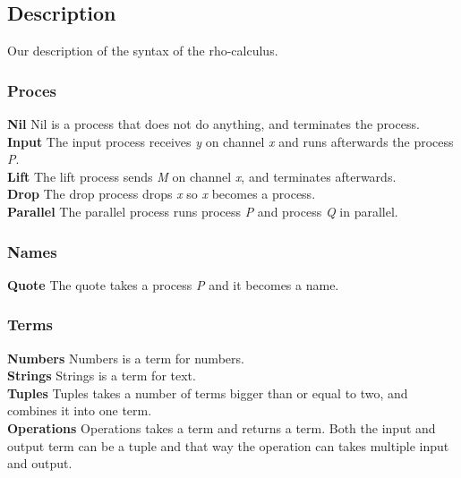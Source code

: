 \subsection{Description}
Our description of the syntax of the rho-calculus.

\subsubsection{Proces}
\textbf{Nil}
Nil is a process that does not do anything, and terminates the process.
\\
\textbf{Input}
The input process receives \textit{y} on channel \textit{x} and runs afterwards the process \textit{P}.
\\
\textbf{Lift}
The lift process sends \textit{M} on channel \textit{x}, and terminates afterwards.
\\
\textbf{Drop}
The drop process drops \textit{x} so \textit{x} becomes a process.
\\
\textbf{Parallel}
The parallel process runs process \textit{P} and process \textit{Q} in parallel.

\subsubsection{Names}
\textbf{Quote}
The quote takes a process \textit{P} and it becomes a name.

\subsubsection{Terms}
\textbf{Numbers} 
Numbers is a term for numbers.
\\
\textbf{Strings}
Strings is a term for text.
\\
\textbf{Tuples}
Tuples takes a number of terms bigger than or equal to two, and combines it into one term.
\\
\textbf{Operations}
Operations takes a term and returns a term. Both the input and output term can be a tuple and that way the operation can takes multiple input and output.
